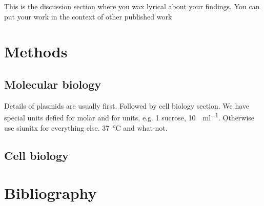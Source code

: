 This is the discussion section where you wax lyrical about your findings.
You can put your work in the context of other published work \citep{brenner_uga:_1967}

\lipsum[100-104]

\section*{Methods}\label{s:methods}

\subsection*{Molecular biology}

Details of plasmids are usually first.
Followed by cell biology section.
We have special units defied for molar and for units, e.g. \SI{1}{\Molar} sucrose, \SI{10}{\Units\per\milli\litre}.
Otherwise use siunitx for everything else. \SI{37}{\degreeCelsius} and what-not.

\subsection*{Cell biology}

\lipsum[80]

\section*{Bibliography}

